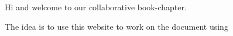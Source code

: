 Hi and welcome to our collaborative book-chapter.  

The idea is to use this website to work on the document using \Latex